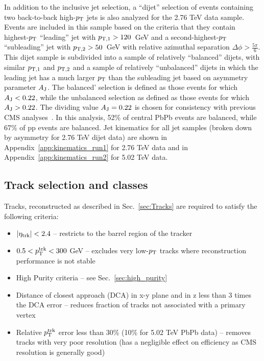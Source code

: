 In addition to the inclusive jet selection, a ``dijet'' selection of events containing two back-to-back high-$p_{\rm T}$ jets is also analyzed for the 2.76 TeV data sample.  Events are included in this sample based on the criteria that they contain highest-$p_{\rm T}$ ``leading'' jet with $p_{\rm T,1} > 120$~GeV and a second-highest-$p_{\rm T}$ ``subleading'' jet with $p_{\rm T,2} > 50$~GeV with relative azimuthal separation $\Delta\phi > \frac{5\pi}{6}$.  This dijet sample is subdivided into a sample of relatively ``balanced'' dijets, with similar $p_{\rm T,1}$ and $p_{\rm T,2}$ and a sample of relatively ``unbalanced'' dijets in which the leading jet has a much larger $p_{\rm T}$ than the subleading jet based on asymmetry parameter $A_{\rm J}$. The balanced' selection is defined as those events for which $A_{\rm J} < 0.22$, while the unbalanced selection as defined as those events for which $A_{\rm J} > 0.22$.  The dividing value $A_{\rm J} = 0.22$ is chosen for consistency with previous CMS analyses~\cite{Chatrchyan:2011sx, HIN_2014_010}.  In this analysis, 52\% of central PbPb events are balanced, while 67\% of pp events are balanced.  Jet kinematics for all jet samples (broken down by asymmetry for 2.76 TeV dijet data) are shown in Appendix~\ref{app:kinematics_run1} for 2.76 TeV data and in Appendix~\ref{app:kinematics_run2} for 5.02 TeV data.

\subsection{Track selection and classes}

Tracks, reconstructed as described in Sec.~\ref{sec:Tracks} are required to satisfy the following criteria: 
\begin{itemize}
\item  $|\eta_{\rm trk}| < 2.4$ -- restricts to the barrel region of the tracker
\item  $0.5 < p_{\rm T}^{\rm trk} < 300$ GeV -- excludes very low-$p_{\rm T}$ tracks where reconstruction performance is not stable
\item High Purity criteria  -- see  Sec.~\ref{sec:high_purity}
\item Distance of closest approach (DCA) in x-y plane and in z less than 3 times the DCA error -- reduces fraction of tracks not associated with a primary vertex
\item Relative $p_{\rm T}^{\rm trk}$ error less than 30\% (10\% for 5.02 TeV PbPb data) -- removes tracks with very poor resolution (has a negligible effect on efficiency as CMS resolution is generally good) 
\end{itemize}

